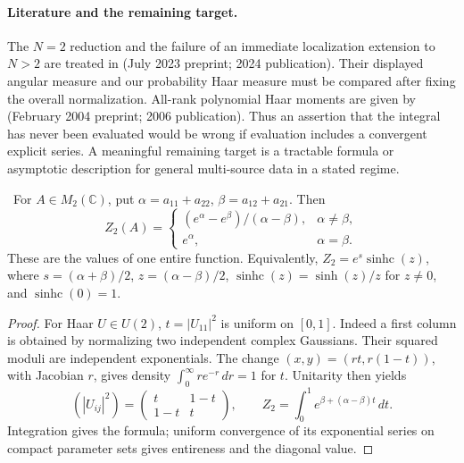 \paragraph{Literature and the remaining target.}
The \(N=2\) reduction and the failure of an immediate localization
extension to \(N>2\) are treated in
\citet[Sections~2.2--2.3 and Appendix~A]{holguin2024multimatrix}
(July 2023 preprint; 2024 publication). Their displayed angular measure
and our probability Haar measure must be compared after fixing the
overall normalization. All-rank polynomial Haar moments are given by
\citet[Corollary~2.4]{collinssniady2006integration}
(February 2004 preprint; 2006 publication).
Thus an assertion that the integral has never been evaluated would
be wrong if evaluation includes a convergent explicit series.
A meaningful remaining target is a tractable formula or asymptotic
description for general multi-source data in a stated regime.

\begin{proposition}\ours\ 
For \(A\in M_2(\mathbb C)\), put
\(\alpha=a_{11}+a_{22}\), \(\beta=a_{12}+a_{21}\).
Then
\[
 Z_2(A)=
 \begin{cases}
 (e^\alpha-e^\beta)/(\alpha-\beta),&\alpha\ne\beta,\\
 e^\alpha,&\alpha=\beta.
 \end{cases}
\]
These are the values of one entire function. Equivalently,
\(Z_2=e^s\operatorname{sinhc}(z)\), where
\(s=(\alpha+\beta)/2\), \(z=(\alpha-\beta)/2\),
\(\operatorname{sinhc}(z)=\sinh(z)/z\) for \(z\ne0\), and
\(\operatorname{sinhc}(0)=1\).
\end{proposition}
\begin{proof}
For Haar \(U\in U(2)\), \(t=|U_{11}|^2\) is uniform on \([0,1]\).
Indeed a first column is obtained by normalizing two independent
complex Gaussians. Their squared moduli are independent exponentials.
The change \((x,y)=(rt,r(1-t))\), with Jacobian \(r\), gives
density \(\int_0^\infty re^{-r}\,dr=1\) for \(t\).
Unitarity then yields
\[
 (|U_{ij}|^2)=\begin{pmatrix}t&1-t\\1-t&t\end{pmatrix},
 \qquad Z_2=\int_0^1e^{\beta+(\alpha-\beta)t}\,dt.
\]
Integration gives the formula; uniform convergence of its exponential
series on compact parameter sets gives entireness and the diagonal value.
\end{proof}

